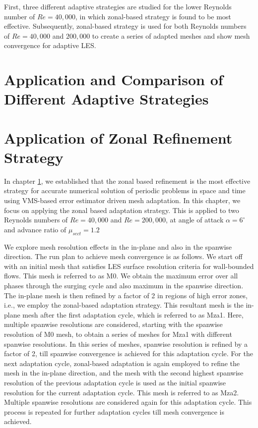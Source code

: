 First, three different adaptive strategies are studied for the lower Reynolds number of $Re=40,000$, in which zonal-based strategy is found to be most effective. Subsequently, zonal-based strategy is used for both Reynolds numbers of $Re=40,000$ and $200,000$ to create a series of adapted meshes and show mesh convergence for adaptive LES.


\section{Application and Comparison of Different Adaptive Strategies}
\label{sec:adaptive_strategy_comparison}




\section{Application of Zonal Refinement Strategy}



In chapter \ref{sec:adaptive_strategy_comparison}, we established that the zonal based refinement is the most effective strategy for accurate numerical solution of periodic problems in space and time using VMS-based error estimator driven mesh adaptation. In this chapter, we focus on applying the zonal based adaptation strategy. This is applied to two Reynolds numbers of $Re=40,000$ and $Re=200,000$, at angle of attack $\alpha=6^\circ$ and advance ratio of $\mu_{sect}=1.2$


We explore mesh resolution effects in the in-plane and also in the spanwise direction. 
The run plan to achieve mesh convergence is as follows. 
We start off with an initial mesh that satisfies LES surface resolution criteria for wall-bounded flows. This mesh is referred to as M0.
We obtain the maximum error over all phases through the surging cycle and also maximum in the spanwise direction.
The in-plane mesh is then refined by a factor of 2 in regions of high error zones, i.e., we employ the zonal-based adaptation strategy.
This resultant mesh is the in-plane mesh after the first adaptation cycle, which is referred to as Mza1.
Here, multiple spanwise resolutions are considered, starting with the spanwise resolution of M0 mesh, to obtain a series of meshes for Mza1 with different spanwise resolutions.
In this series of meshes, spanwise resolution is refined by a factor of 2, till spanwise convergence is achieved for this adaptation cycle. 
For the next adaptation cycle, zonal-based adaptation is again employed to refine the mesh in the in-plane direction, and the mesh with the second highest spanwise resolution of the previous adaptation cycle is used as the initial spanwise resolution for the current adaptation cycle. 
This mesh is referred to as Mza2.
Multiple spanwise resolutions are considered again for this adaptation cycle.
This process is repeated for further adaptation cycles till mesh convergence is achieved.

